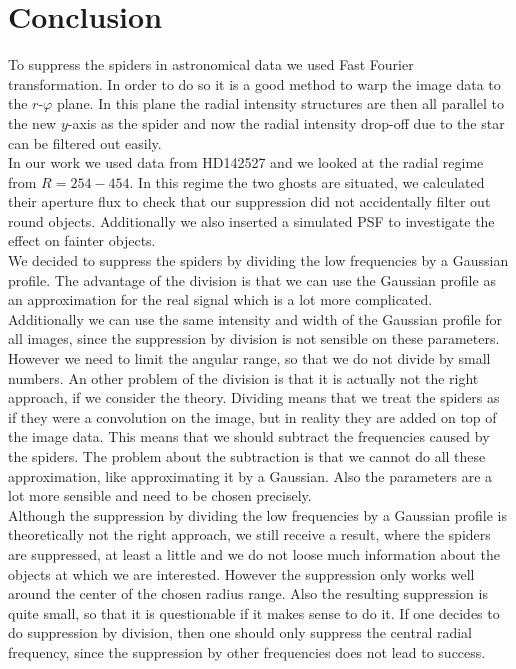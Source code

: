 \section{Conclusion}
\label{sec:conclusion}
To suppress the spiders in astronomical data we used Fast Fourier transformation. In order to do so it is a good method to warp the image data to the $r$-$\varphi$ plane. In this plane the radial intensity structures are then all parallel to the new $y$-axis as the spider and now the radial intensity drop-off due to the star can be filtered out easily.\\
In our work we used data from HD142527 and we looked at the radial regime from $R=254-454$. In this regime the two ghosts are situated, we calculated their aperture flux to check that our suppression did not accidentally filter out round objects. Additionally we also inserted a simulated PSF to investigate the effect on fainter objects. \\
We decided to suppress the spiders by dividing the low frequencies by a Gaussian profile. The advantage of the division is that we can use the Gaussian profile as an approximation for the real signal which is a lot more complicated. Additionally we can use the same intensity and width of the Gaussian profile for all images, since the suppression by division is not sensible on these parameters. However we need to limit the angular range, so that we do not divide by small numbers. An other problem of the division is that it is actually not the right approach, if we consider the theory. Dividing means that we treat the spiders as if they were a convolution on the image, but in reality they are added on top of the image data. This means that we should subtract the frequencies caused by the spiders. The problem about the subtraction is that we cannot do all these approximation, like approximating it by a Gaussian. Also the parameters are a lot more sensible and need to be chosen precisely. \\
Although the suppression by dividing the low frequencies by a Gaussian profile is theoretically not the right approach, we still receive a result, where the spiders are suppressed, at least a little and we do not loose much information about the objects at which we are interested. However the suppression only works well around the center of the chosen radius range. Also the resulting suppression is quite small, so that it is questionable if it makes sense to do it. If one decides to do suppression by division, then one should only suppress the central radial frequency, since the suppression by other frequencies does not lead to success.\\ 

